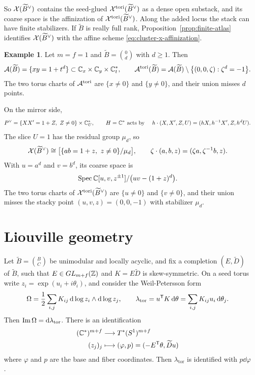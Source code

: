 \documentclass[12pt, letter]{amsart}
\theoremstyle{definition}
\newtheorem{example}[dummy]{Example}
\begin{document}
So $\mathcal{X}(\widetilde B^\vee)$ contains the seed-glued $\mathcal{X}^{\mathrm{tori}}(\widetilde B^\vee)$ as a dense open substack, and its coarse space is the affinization of $\mathcal{X}^{\mathrm{tori}}(\widetilde B^\vee)$.
Along the added locus the stack can have finite stabilizers.
If $\widetilde B$ is really full rank, Proposition~\ref{prop:finite-atlas} identifies $\mathcal{X}(\widetilde B^\vee)$ with the affine scheme \eqref{eq:cluster-x-affinization}.

\begin{example}
Let $m=f=1$ and $\widetilde B=\binom0d$ with $d\ge1$.
Then
\[
\mathcal{A}(\widetilde B) = \{ xy = 1+t^d\} \subset \mathbb{C}_x \times \mathbb{C}_y \times \mathbb{C}_t^*, \qquad
\mathcal A^{\mathrm{tori}}(\widetilde B)
=
\mathcal A(\widetilde B)
\setminus
\bigl\{(0,0,\zeta):\zeta^d=-1\bigr\}.
\]
The two torus charts of \(\mathcal{A}^{\mathrm{tori}}\) are \( \{x\neq 0 \}\) and \(\{y\neq 0\}\), and their union misses \(d\) points. 

On the mirror side,
\[
 P^\vee=\{XX'=1+Z,\ Z\ne0\} \times \bC_U^*,\qquad H = \bC^* \text{ acts by } \quad
 h\cdot(X,X',Z,U)=(hX,h^{-1}X',Z,h^dU).
\]
The slice $U=1$ has the residual group $\mu_d$, so
\[
 \mathcal{X}(\widetilde B^\vee)\cong\bigl[\{ab=1+z,\ z\ne0\}/\mu_d\bigr],\qquad
 \zeta\cdot(a,b,z)=(\zeta a,\zeta^{-1}b,z).
\]
With $u=a^d$ and $v=b^d$, its coarse space is
\[
 \operatorname{Spec}\mathbb{C}[u,v,z^{\pm1}]/\bigl(uv-(1+z)^d\bigr).
\]
The two torus charts of $\mathcal{X}^{\mathrm{tori}}(\widetilde B^\vee)$ are $\{u\ne0\}$ and $\{v\ne0\}$, and their union misses the stacky point $(u,v,z)=(0,0,-1)$ with stabilizer $\mu_d$.
\end{example}

\section{Liouville geometry}
\label{sec:geometry}

Let \( \widetilde B = \binom{B}{C} \) be unimodular and locally acyclic, and fix a  completion $(E,\widetilde D)$ of $\widetilde B$, such that \(E\in GL_{m+f}(\mathbb{Z}) \) and $K=E\widetilde D$ is skew-symmetric. 
On a seed torus write $z_i=\exp(u_i+i\theta_i)$, and consider the Weil-Petersson form~\cite{GSV05}
\begin{equation}\label{eq:forms}
 \Omega=\frac12\sum_{i,j}K_{ij}\,\mathrm{d}\log z_i\wedge \mathrm{d}\log z_j,\qquad
 \lambda_{\mathrm{tor}}=u^{\mathsf T}K\,\mathrm{d}\theta=\sum_{i,j}K_{ij}u_i\,\mathrm{d}\theta_j.
\end{equation}
Then \(  \operatorname{Im}\Omega= \mathrm{d}\lambda_{\mathrm{tor}} \). 
There is an identification
\begin{align}
\label{eq:identify_with_torus}
   (\mathbb{C}^*)^{m+f}  & \longrightarrow  T^*(S^1)^{m+f} \\
    (z_j)_j & \longmapsto (\varphi, p) = ( -E^\mathsf T \theta, \widetilde Du) \notag
\end{align}
where \(\varphi\) and \(p\) are the base and fiber coordinates. Then \(\lambda_{\mathrm{tor}}\) is identified with \( p \dd\varphi\).  
\end{document}

